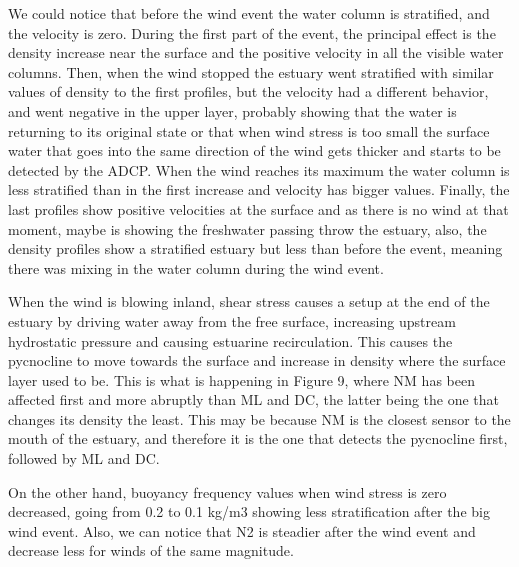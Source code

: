 \documentclass[tesis.tex]{subfiles}
\begin{document}
    We could notice that before the wind event the water column is stratified, and the velocity is zero. During the first part of the event, the principal effect is the density increase near the surface and the positive velocity in all the visible water columns. Then, when the wind stopped the estuary went stratified with similar values of density to the first profiles, but the velocity had a different behavior, and went negative in the upper layer, probably showing that the water is returning to its original state or that when wind stress is too small the surface water that goes into the same direction of the wind gets thicker and starts to be detected by the ADCP. When the wind reaches its maximum the water column is less stratified than in the first increase and velocity has bigger values. Finally, the last profiles show positive velocities at the surface and as there is no wind at that moment, maybe is showing the freshwater passing throw the estuary, also, the density profiles show a stratified estuary but less than before the event, meaning there was mixing in the water column during the wind event.
    
    When the wind is blowing inland, shear stress causes a setup at the end of the estuary by driving water away from the free surface, increasing upstream hydrostatic pressure and causing estuarine recirculation. This causes the pycnocline to move towards the surface and increase in density where the surface layer used to be. This is what is happening in Figure 9, where NM has been affected first and more abruptly than ML and DC, the latter being the one that changes its density the least. This may be because NM is the closest sensor to the mouth of the estuary, and therefore it is the one that detects the pycnocline first, followed by ML and DC.
    
    On the other hand, buoyancy frequency values when wind stress is zero decreased, going from 0.2 to 0.1 kg/m3  showing less stratification after the big wind event. Also, we can notice that N2 is steadier after the wind event and decrease less for winds of the same magnitude.
    
    
\end{document}
